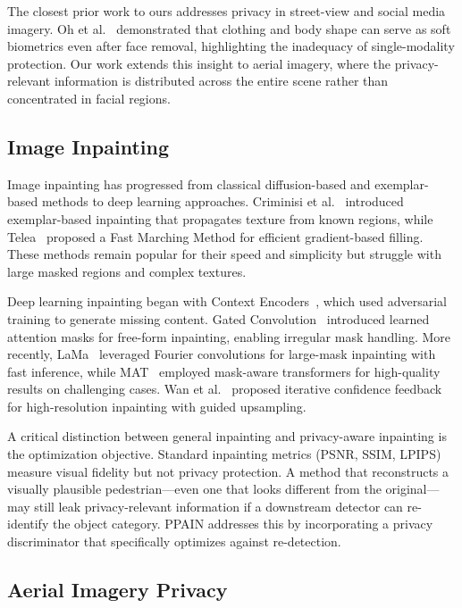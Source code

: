 \documentclass[preprint,12pt]{elsarticle}
\begin{document}
The closest prior work to ours addresses privacy in street-view and social media imagery. Oh et al.~\cite{oh2016face} demonstrated that clothing and body shape can serve as soft biometrics even after face removal, highlighting the inadequacy of single-modality protection. Our work extends this insight to aerial imagery, where the privacy-relevant information is distributed across the entire scene rather than concentrated in facial regions.

\subsection{Image Inpainting}

Image inpainting has progressed from classical diffusion-based and exemplar-based methods to deep learning approaches. Criminisi et al.~\cite{criminisi2004region} introduced exemplar-based inpainting that propagates texture from known regions, while Telea~\cite{telea2004imageinpainting} proposed a Fast Marching Method for efficient gradient-based filling. These methods remain popular for their speed and simplicity but struggle with large masked regions and complex textures.

Deep learning inpainting began with Context Encoders~\cite{pathak2016context}, which used adversarial training to generate missing content. Gated Convolution~\cite{yu2018free} introduced learned attention masks for free-form inpainting, enabling irregular mask handling. More recently, LaMa~\cite{suvorov2022lama} leveraged Fourier convolutions for large-mask inpainting with fast inference, while MAT~\cite{li2022mat} employed mask-aware transformers for high-quality results on challenging cases. Wan et al.~\cite{wan2021high} proposed iterative confidence feedback for high-resolution inpainting with guided upsampling.

A critical distinction between general inpainting and privacy-aware inpainting is the optimization objective. Standard inpainting metrics (PSNR, SSIM, LPIPS) measure visual fidelity but not privacy protection. A method that reconstructs a visually plausible pedestrian---even one that looks different from the original---may still leak privacy-relevant information if a downstream detector can re-identify the object category. PPAIN addresses this by incorporating a privacy discriminator that specifically optimizes against re-detection.

\subsection{Aerial Imagery Privacy}
\end{document}
